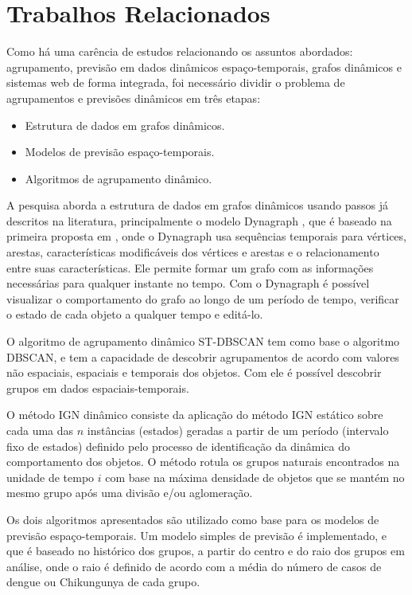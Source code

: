 \section{Trabalhos Relacionados}
\label{sec:trabalhos-relacionados}

Como há uma carência de estudos relacionando os assuntos abordados: agrupamento, previsão em dados dinâmicos espaço-temporais, grafos dinâmicos e sistemas web de forma integrada, foi necessário dividir o problema de agrupamentos e previsões dinâmicos em três etapas:
\begin{itemize}
\item Estrutura de dados em grafos dinâmicos.
\item Modelos de previsão espaço-temporais.
\item Algoritmos de agrupamento dinâmico.
\end{itemize}

A pesquisa aborda a estrutura de dados em grafos dinâmicos usando passos já descritos na literatura, principalmente o modelo Dynagraph \cite{dynagraph}, que é baseado na primeira proposta em \cite{dynagraph2012}, onde o Dynagraph usa sequências temporais para vértices, arestas, características modificáveis dos vértices e arestas e o relacionamento entre suas características. Ele permite formar um grafo com as informações necessárias para qualquer instante no tempo. Com o Dynagraph é possível visualizar o comportamento do grafo ao longo de um período de tempo, verificar o estado de cada objeto a qualquer tempo e editá-lo.

O algoritmo de agrupamento dinâmico ST-DBSCAN tem como base o algoritmo DBSCAN, e tem a capacidade de descobrir
agrupamentos de acordo com valores não espaciais, espaciais e temporais dos objetos. Com ele é possível descobrir grupos em dados espaciais-temporais.

O método IGN dinâmico consiste da aplicação do método IGN estático \cite{simposioNeg2003} sobre cada uma das $n$ instâncias (estados) geradas a partir de um período (intervalo fixo de estados) definido pelo processo de identificação da dinâmica do comportamento dos objetos. O método rotula os grupos naturais encontrados na unidade de tempo $i$ com base na máxima densidade de objetos que se mantém no mesmo grupo após uma divisão e/ou aglomeração.

Os dois algoritmos apresentados são utilizado como base para os modelos de previsão espaço-temporais. Um modelo simples de previsão é implementado, e que é baseado no histórico dos grupos, a partir do centro e do raio dos grupos em análise, onde o raio é definido de acordo com a média do número de casos de dengue ou Chikungunya de cada grupo.